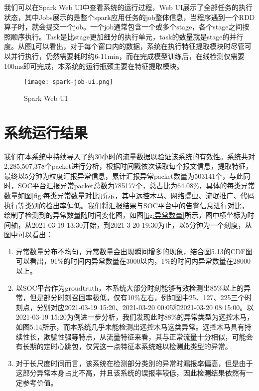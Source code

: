 我们可以在Spark Web UI中查看系统的运行过程，Web UI展示了全部任务的执行状态，其中Jobs展示的是整个spark应用任务的job整体信息，当程序遇到一个RDD算子时，就会提交一个job。一个job通常包含一个或多个stage，各个stage之间按照顺序执行。Task是比stage更加细分的执行单元，task的数量就是stage的并行度。从图\ref{fig:spark-job}可以看出，对于每个窗口内的数据，系统在执行特征提取模块时尽管可以并行执行，仍然需要耗时约6-11min，而在完成模型训练后，在线检测仅需要100ms即可完成，本系统的运行瓶颈主要在特征提取模块。
\begin{figure}
  \centering
  \texttt{[image: spark-job-ui.png]}
  \caption{Spark Web UI}
  \label{fig:spark-job}
\end{figure}

\section{系统运行结果}
我们在本系统中持续导入了约30小时的流量数据以验证该系统的有效性。系统共对2,285,507,378个packet进行分析，根据时间戳依次读取每个报文信息，提取特征，最终以5分钟为粒度汇报异常信息，累计汇报异常packet数量为503141个，与此同时，SOC平台汇报异常packet总数为785177个，总占比为64.08\%，具体的每类异常数量如图\ref{fig:每类异常数量对比}所示，其中远控木马、网络蠕虫、流氓推广、代码执行等类别的检出率偏低。我们将汇报结果与SOC平台中的告警信息进行对比，绘制了检测到的异常数量随时间变化图，如图\ref{fig:异常数量}所示，图中横坐标为时间轴，从2021-03-19 13:30开始，到2021-3-20 19:30为止，以5分钟为一个刻度，从图中可以看出：
\begin{enumerate}
  \item 异常数量分布不均匀，异常数量会出现瞬间增多的现象，结合图5.13的CDF图可以看出，91\%的时间内异常数量在3000以内，1\%的时间内异常数量在28000以上。
  \item 以SOC平台作为groudtruth，本系统大部分时刻能够有效检测出85\%以上的异常，但是部分时刻召回率极低，仅有10\%左右，例如图中25、127、225三个时刻点，分别对应2021-03-19 15:20、2021-03-20 00:05和2021-03-20 08:15:00。以2021-03-19 15:20为例进一步分析，我们发现此时88\%的异常类型为远控木马，如图5.14所示，而本系统几乎未能检测出远控木马这类异常。远控木马具有持续性长，欺骗性强等特点，从流量特征来看，其与正常流量十分相似，可能会有长期的定时心跳包，仅凭这一点特征本系统难以检测此类型的异常。
  \item 对于长尺度时间而言，该系统在检测部分类别的异常时漏报率偏高，但是由于这部分异常本身占比不高，并且该系统的误报率较低，因此检测结果依然有一定参考价值。
\end{enumerate}


